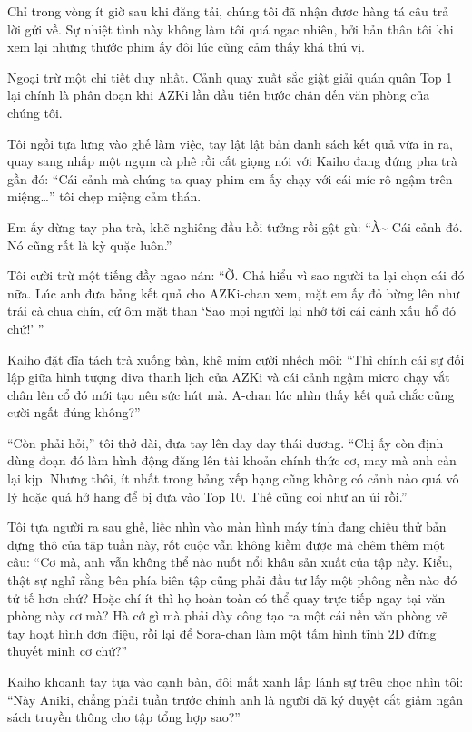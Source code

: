 \documentclass[../main.tex]{subfiles}
\begin{document}
Chỉ trong vòng ít giờ sau khi đăng tải, chúng tôi đã nhận được hàng tá câu trả lời gửi về. Sự nhiệt tình này không làm tôi quá ngạc nhiên, bởi bản thân tôi khi xem lại những thước phim ấy đôi lúc cũng cảm thấy khá thú vị.

Ngoại trừ một chi tiết duy nhất. Cảnh quay xuất sắc giật giải quán quân Top 1 lại chính là phân đoạn khi AZKi lần đầu tiên bước chân đến văn phòng của chúng tôi.

Tôi ngồi tựa lưng vào ghế làm việc, tay lật lật bản danh sách kết quả vừa in ra, quay sang nhấp một ngụm cà phê rồi cất giọng nói với Kaiho đang đứng pha trà gần đó: ``Cái cảnh mà chúng ta quay phim em ấy chạy với cái míc-rô ngậm trên miệng\dots'' tôi chẹp miệng cảm thán.

Em ấy dừng tay pha trà, khẽ nghiêng đầu hồi tưởng rồi gật gù: ``À\~{} Cái cảnh đó. Nó cũng rất là kỳ quặc luôn.''

Tôi cười trừ một tiếng đầy ngao nán: ``Ờ. Chả hiểu vì sao người ta lại chọn cái đó nữa. Lúc anh đưa bảng kết quả cho AZKi-chan xem, mặt em ấy đỏ bừng lên như trái cà chua chín, cứ ôm mặt than `Sao mọi người lại nhớ tới cái cảnh xấu hổ đó chứ!' ''

Kaiho đặt đĩa tách trà xuống bàn, khẽ mỉm cười nhếch môi: ``Thì chính cái sự đối lập giữa hình tượng diva thanh lịch của AZKi và cái cảnh ngậm micro chạy vắt chân lên cổ đó mới tạo nên sức hút mà. A-chan lúc nhìn thấy kết quả chắc cũng cười ngất đúng không?''

``Còn phải hỏi,'' tôi thở dài, đưa tay lên day day thái dương. ``Chị ấy còn định dùng đoạn đó làm hình động đăng lên tài khoản chính thức cơ, may mà anh cản lại kịp. Nhưng thôi, ít nhất trong bảng xếp hạng cũng không có cảnh nào quá vô lý hoặc quá hở hang để bị đưa vào Top 10. Thế cũng coi như an ủi rồi.''

Tôi tựa người ra sau ghế, liếc nhìn vào màn hình máy tính đang chiếu thử bản dựng thô của tập tuần này, rốt cuộc vẫn không kiềm được mà chêm thêm một câu: ``Cơ mà, anh vẫn không thể nào nuốt nổi khâu sản xuất của tập này. Kiểu, thật sự nghĩ rằng bên phía biên tập cũng phải đầu tư lấy một phông nền nào đó tử tế hơn chứ? Hoặc chí ít thì họ hoàn toàn có thể quay trực tiếp ngay tại văn phòng này cơ mà? Hà cớ gì mà phải dày công tạo ra một cái nền văn phòng vẽ tay hoạt hình đơn điệu, rồi lại để Sora-chan làm một tấm hình tĩnh 2D đứng thuyết minh cơ chứ?''

Kaiho khoanh tay tựa vào cạnh bàn, đôi mắt xanh lấp lánh sự trêu chọc nhìn tôi: ``Này Aniki, chẳng phải tuần trước chính anh là người đã ký duyệt cắt giảm ngân sách truyền thông cho tập tổng hợp sao?''
\end{document}

